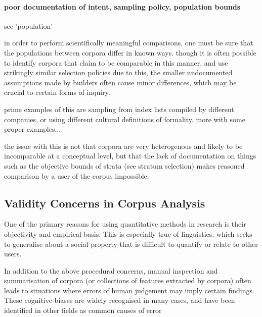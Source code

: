 \paragraph{poor documentation of intent, sampling policy, population bounds}
see 'population'

in order to perform scientifically meaningful comparisons, one must be sure that the populations between corpora differ in known ways.  though it is often possible to identify corpora that claim to be comparable in this manner, and use strikingly similar selection policies due to this, the smaller undocumented assumptions made by builders often cause minor differences, which may be crucial to certain forms of inquiry.

prime examples of this are sampling from index lists compiled by different companies, or using different cultural definitions of formality.  more with some proper examples...

the issue with this is not that corpora are very heterogenous and likely to be incomparable at a conceptual level, but that the lack of documentation on things such as the objective bounds of strata (see stratum selection) makes reasoned comparison by a user of the corpus impossible.















\subsection{Validity Concerns in Corpus Analysis}
One of the primary reasons for using quantitative methods in research is their objectivity and empirical basis.  This is especially true of linguistics, which seeks to generalise about a social property that is difficult to quantify or relate to other users.

In addition to the above procedural concerns, manual inspection and summarisation of corpora (or collections of features extracted by corpora) often leads to situations where errors of human judgement may imply certain findings.  These cognitive biases are widely recognised in many cases, and have been identified in other fields as common causes of error 

